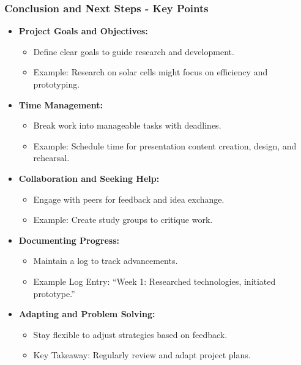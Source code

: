 \documentclass[aspectratio=169]{beamer}
\begin{document}
\begin{frame}[fragile]
    \frametitle{Conclusion and Next Steps - Key Points}
    \begin{itemize}
        \item \textbf{Project Goals and Objectives:}
        \begin{itemize}
            \item Define clear goals to guide research and development.
            \item Example: Research on solar cells might focus on efficiency and prototyping.
        \end{itemize}
        
        \item \textbf{Time Management:}
        \begin{itemize}
            \item Break work into manageable tasks with deadlines.
            \item Example: Schedule time for presentation content creation, design, and rehearsal.
        \end{itemize}
        
        \item \textbf{Collaboration and Seeking Help:}
        \begin{itemize}
            \item Engage with peers for feedback and idea exchange.
            \item Example: Create study groups to critique work.
        \end{itemize}
        
        \item \textbf{Documenting Progress:}
        \begin{itemize}
            \item Maintain a log to track advancements.
            \item Example Log Entry: “Week 1: Researched technologies, initiated prototype.”
        \end{itemize}
        
        \item \textbf{Adapting and Problem Solving:}
        \begin{itemize}
            \item Stay flexible to adjust strategies based on feedback.
            \item Key Takeaway: Regularly review and adapt project plans.
        \end{itemize}
    \end{itemize}
\end{frame}
\end{document}
